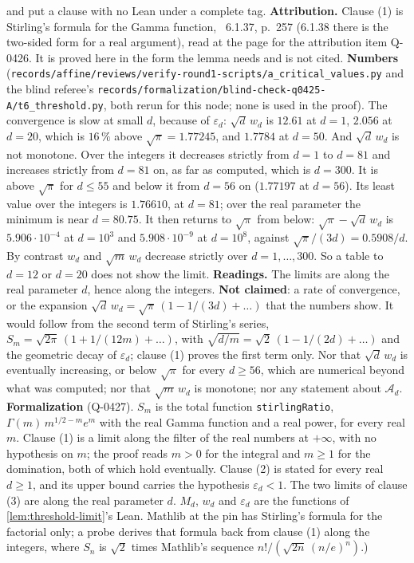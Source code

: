 \begin{lemma}
{and put a clause with no Lean under a complete tag. \textbf{Attribution.} Clause (1) is
Stirling's formula for the Gamma function, ~6.1.37, p.~257 (6.1.38
there is the two-sided form for a real argument), read at the page for the attribution item
Q-0426. It is proved here in the form the lemma needs and is not cited. \textbf{Numbers}
(\texttt{records/affine/reviews/verify-round1-scripts/a\_critical\_values.py} and the blind
referee's \texttt{records/formalization/blind-check-q0425-A/t6\_threshold.py}, both rerun for
this node; none is used in the proof). The convergence is slow at small $d$, because of
$\varepsilon_d$: $\sqrt d\,w_d$ is $12.61$ at $d = 1$, $2.056$ at $d = 20$, which is $16\,\%$
above $\sqrt\pi = 1.77245$, and $1.7784$ at $d = 50$. And $\sqrt d\,w_d$ is not monotone. Over
the integers it decreases strictly from $d = 1$ to $d = 81$ and increases strictly from $d = 81$
on, as far as computed, which is $d = 300$. It is above $\sqrt\pi$ for $d \le 55$ and below it
from $d = 56$ on ($1.77197$ at $d = 56$). Its least value over the integers is $1.76610$, at
$d = 81$; over the real parameter the minimum is near $d = 80.75$. It then returns to $\sqrt\pi$
from below: $\sqrt\pi - \sqrt d\,w_d$ is $5.906 \cdot 10^{-4}$ at $d = 10^3$ and
$5.908 \cdot 10^{-9}$ at $d = 10^8$, against $\sqrt\pi/(3d) = 0.5908/d$. By contrast $w_d$ and
$\sqrt m\,w_d$ decrease strictly over $d = 1,\dots,300$. So a table to $d = 12$ or $d = 20$ does
not show the limit. \textbf{Readings.} The limits are along the real parameter $d$, hence along
the integers. \textbf{Not claimed}: a rate of convergence, or the expansion
$\sqrt d\,w_d = \sqrt\pi\,(1 - 1/(3d) + \dots)$ that the numbers show. It would follow from the
second term of Stirling's series, $S_m = \sqrt{2\pi}\,(1 + 1/(12m) + \dots)$, with
$\sqrt{d/m} = \sqrt2\,(1 - 1/(2d) + \dots)$ and the geometric decay of $\varepsilon_d$; clause (1)
proves the first term only. Nor that $\sqrt d\,w_d$ is eventually increasing, or below $\sqrt\pi$
for every $d \ge 56$, which are numerical beyond what was computed; nor that $\sqrt m\,w_d$ is
monotone; nor any statement about $\mathcal{A}_d$. \textbf{Formalization} (Q-0427). $S_m$ is the
total function \texttt{stirlingRatio}, $\Gamma(m)\,m^{1/2-m}e^{m}$ with the real Gamma function
and a real power, for every real $m$. Clause (1) is a limit along the filter of the real numbers
at $+\infty$, with no hypothesis on $m$; the proof reads $m > 0$ for the integral and $m \ge 1$
for the domination, both of which hold eventually. Clause (2) is stated for every real $d \ge 1$,
and its upper bound carries the hypothesis $\varepsilon_d < 1$. The two limits of clause (3) are
along the real parameter $d$. $M_d$, $w_d$ and $\varepsilon_d$ are the functions of
\ref{lem:threshold-limit}'s Lean. Mathlib at the pin has Stirling's formula for the factorial
only; a probe derives that formula back from clause (1) along the integers, where $S_n$ is
$\sqrt2$ times Mathlib's sequence $n!/(\sqrt{2n}\,(n/e)^n)$.)}
\end{lemma}


